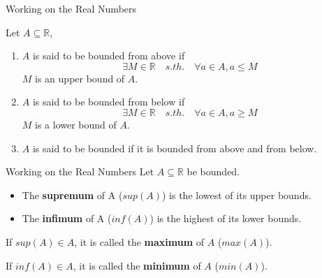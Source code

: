 \documentclass[aspectratio=169]{beamer}
\begin{document}
\begin{frame}{Working on the Real Numbers}
    \begin{definition}
        Let $A\subseteq\mathbb{R}$,
        \begin{enumerate}
            \item $A$ is said to be bounded from above if $$\exists M\in\mathbb{R}\quad s.th.\quad \forall a\in A, a\leq M$$ $M$ is an upper bound of $A$.
            \item $A$ is said to be bounded from below if $$\exists M\in\mathbb{R}\quad s.th.\quad \forall a\in A, a\geq M$$ $M$ is a lower bound of $A$.
            \item $A$ is said to be bounded if it is bounded from above and from below.
        \end{enumerate}
    \end{definition}
\end{frame}

\begin{frame}{Working on the Real Numbers}
    Let $A\subseteq\mathbb{R}$ be bounded.
    
    \begin{definition}
        \begin{itemize}
            \item The \textbf{supremum} of A ($sup(A)$) is the lowest of its upper bounds.
            \item The \textbf{infimum} of A ($inf(A)$) is the highest of its lower bounds.
        \end{itemize}
    \end{definition}
    
    If $sup(A)\in A$, it is called the \textbf{maximum} of $A$ ($max(A)$).
    
    If $inf(A)\in A$, it is called the \textbf{minimum} of $A$ ($min(A)$).
\end{frame}
\end{document}

